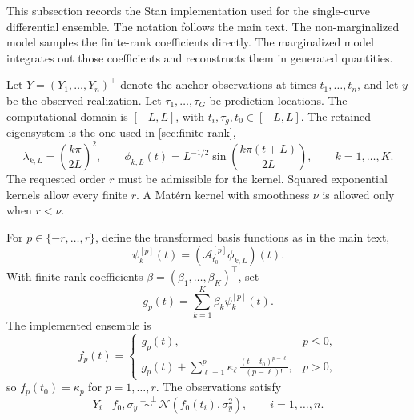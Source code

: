 \documentclass[11pt,a4paper]{article}
\theoremstyle{definition}
\theoremstyle{remark}
\newcommand{\indep}{\perp\!\!\!\perp}
\begin{document}
This subsection records the Stan implementation used for the single-curve differential ensemble. The notation follows the main text. The non-marginalized model samples the finite-rank coefficients directly. The marginalized model integrates out those coefficients and reconstructs them in generated quantities.

Let \(Y=(Y_1,\ldots,Y_n)^\top\) denote the anchor observations at times \(t_1,\ldots,t_n\), and let \(y\) be the observed realization. Let \(\tau_1,\ldots,\tau_G\) be prediction locations. The computational domain is \([-L,L]\), with \(t_i,\tau_g,t_0\in[-L,L]\). The retained eigensystem is the one used in \cref{sec:finite-rank},
\[
\lambda_{k,L}=\left(\frac{k\pi}{2L}\right)^2,
\qquad
\phi_{k,L}(t)=L^{-1/2}\sin\left(\frac{k\pi(t+L)}{2L}\right),
\qquad
k=1,\ldots,K.
\]
The requested order \(r\) must be admissible for the kernel. Squared exponential kernels allow every finite \(r\). A Mat\'ern kernel with smoothness \(\nu\) is allowed only when \(r<\nu\).

For \(p\in\{-r,\ldots,r\}\), define the transformed basis functions as in the main text,
\[
\psi_k^{[p]}(t)=(\mathcal A_{t_0}^{[p]}\phi_{k,L})(t).
\]
With finite-rank coefficients \(\beta=(\beta_1,\ldots,\beta_K)^\top\), set
\[
g_p(t)=\sum_{k=1}^K\beta_k\psi_k^{[p]}(t).
\]
The implemented ensemble is
\[
f_p(t)=
\begin{cases}
g_p(t), & p\le 0,\\[4pt]
g_p(t)+\displaystyle\sum_{\ell=1}^p
\kappa_\ell\,\frac{(t-t_0)^{p-\ell}}{(p-\ell)!}, & p>0,
\end{cases}
\]
so \(f_p(t_0)=\kappa_p\) for \(p=1,\ldots,r\). The observations satisfy
\[
Y_i\mid f_0,\sigma_y \overset{\indep}{\sim}
\mathcal N(f_0(t_i),\sigma_y^2),
\qquad i=1,\ldots,n.
\]
\end{document}
